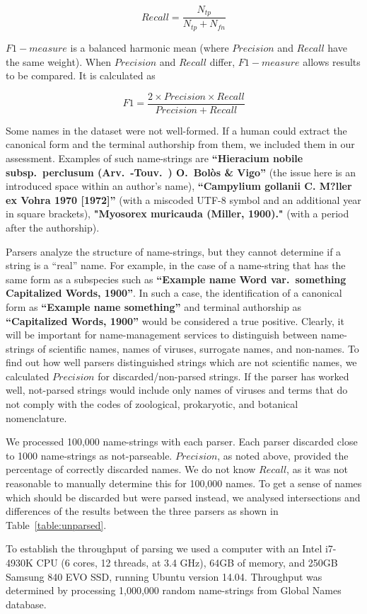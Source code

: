 \documentclass{bmcart}
\begin{document}
\[Recall = \dfrac{N_{tp}}{N_{tp} + N_{fn}}\]

$F1-measure$ is a balanced harmonic mean (where $Precision$ and $Recall$ have the same weight). When $Precision$ and $Recall$ differ, $F1-measure$ allows results to be compared. It is calculated as

\[F1 = \dfrac{2 \times Precision \times Recall}{Precision + Recall}\]


Some names in the dataset were not well-formed. If a human could extract the canonical form and the terminal authorship from them, we included them in our assessment.  Examples of such name-strings are \textbf{``Hieracium nobile subsp.\ perclusum (Arv.\ -Touv.\ ) O.\ Bolòs \& Vigo''} (the issue here is an introduced space within an author's name), \textbf{``Campylium gollanii C. M?ller ex Vohra 1970 [1972]''} (with a miscoded UTF-8 symbol and an additional year in square brackets), \textbf{"Myosorex muricauda (Miller, 1900)."} (with a period after the authorship).

Parsers analyze the structure of name-strings, but they cannot determine if a string is a ``real'' name. For example, in the case of a name-string that has the same form as a subspecies such as \textbf{``Example name Word var.\ something Capitalized Words, 1900''}. In such a case, the identification of a canonical form as \textbf{``Example name something''} and terminal authorship as \textbf{``Capitalized Words, 1900''} would be considered a true positive.  Clearly, it will be important for name-management services to distinguish between name-strings of scientific names, names of viruses, surrogate names, and non-names. To find out how well parsers distinguished strings which are not scientific names, we calculated $Precision$ for discarded/non-parsed strings.  If the parser has worked well, not-parsed strings would include only names of viruses and terms that do not comply with the codes of zoological, prokaryotic, and botanical nomenclature.

We processed 100,000 name-strings with each parser. Each parser discarded close to 1000 name-strings as not-parseable. $Precision$, as noted above, provided the percentage of correctly discarded names. We do not know $Recall$, as it was not reasonable to manually determine this for 100,000 names. To get a sense of names which should be discarded but were parsed instead, we analysed intersections and differences of the results between the three parsers as shown in Table~\ref{table:unparsed}.

To establish the throughput of parsing we used a computer with an Intel i7-4930K CPU (6 cores, 12 threads, at 3.4 GHz), 64GB of memory, and 250GB Samsung 840 EVO SSD, running Ubuntu version 14.04. Throughput was determined by processing 1,000,000 random name-strings from Global Names database.
\end{document}
